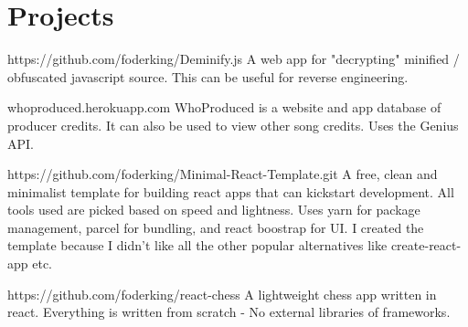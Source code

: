 \section{Projects}
\begin{experience}{https://github.com/foderking/Deminify.js}{
}
A web app for "decrypting" minified / obfuscated javascript source.
This can be useful for reverse engineering.
\end{experience}

\begin{experience}{whoproduced.herokuapp.com}{
}
WhoProduced is a website and app database of producer credits.
It can also be used to view other song credits.
Uses the Genius API.
\end{experience}

\begin{experience}{https://github.com/foderking/Minimal-React-Template.git}{
}
A free, clean and minimalist template for building react apps that can kickstart development.
All tools used are picked based on speed and lightness.
Uses yarn for package management, parcel for bundling, and react boostrap for UI.
I created the template because I didn't like all the other popular alternatives like create-react-app etc.
\end{experience}


\begin{experience}[last]{https://github.com/foderking/react-chess}{
}
A lightweight chess app written in react. Everything is written from scratch - No external libraries of frameworks.

\end{experience}



